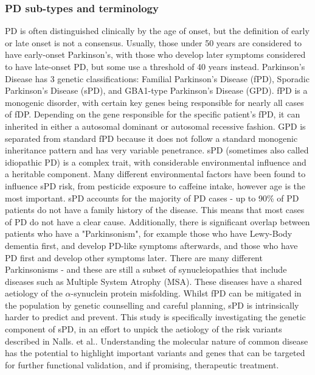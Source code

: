\documentclass{article}
\begin{document}
\subsubsection{PD sub-types and terminology}
PD is often distinguished clinically by the age of onset, but the definition of early or late onset is not a consensus. Usually, those under 50 years are considered to have early-onset Parkinson's, with those who develop later symptoms considered to have late-onset PD, but some use a threshold of 40 years instead\cite{Ferguson2016Early-onsetStudy}.
Parkinson's Disease has 3 genetic classifications: Familial Parkinson's Disease (fPD), Sporadic Parkinson's Disease (sPD), and GBA1-type Parkinson's Disease (GPD). fPD is a monogenic disorder, with certain key genes being responsible for nearly all cases of fDP. Depending on the gene responsible for the specific patient's fPD, it can inherited in either a autosomal dominant or autosomal recessive fashion\cite{Day2021ThePractice}. GPD is separated from standard fPD because it does not follow a standard monogenic inheritance pattern and has very variable penetrance.
sPD (sometimes also called idiopathic PD) is a complex trait, with considerable environmental influence and a heritable component\cite{Nalls2019IdentificationStudies}. Many different environmental factors have been found to influence sPD risk\cite{Costa2023ParkinsonsDisorder}, from pesticide exposure to caffeine intake, however age is the most important. sPD accounts for the majority of PD cases - up to 90\% of PD patients do not have a family history of the disease\cite{Inamdar2007ParkinsonsBeyond}. This means that most cases of PD do not have a clear cause. Additionally, there is significant overlap between patients who have a "Parkinsonism", for example those who have Lewy-Body dementia first, and develop PD-like symptoms afterwards\cite{Jellinger2018DementiaControversies}, and those who have PD first and develop other symptoms later.
There are many different Parkinsonisms - and these are still a subset of synucleiopathies that include diseases such as Multiple System Atrophy (MSA)\cite{Hayes2019ParkinsonsParkinsonism}. These diseases have a shared aetiology of the $\alpha$-synuclein protein misfolding.
Whilst fPD can be mitigated in the population by genetic counselling and careful planning, sPD is intrinsically harder to predict and prevent. This study is specifically investigating the genetic component of sPD, in an effort to unpick the aetiology of the risk variants described in Nalls. et al.\cite{Nalls2019IdentificationStudies}. Understanding the molecular nature of common disease has the potential to highlight important variants and genes that can be targeted for further functional validation, and if promising, therapeutic treatment.
\end{document}
